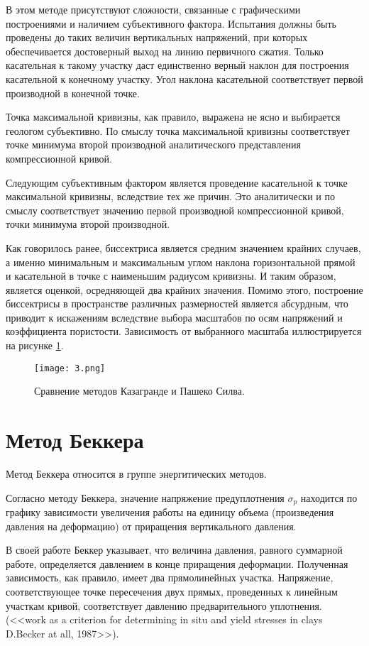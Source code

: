 В этом методе присутствуют сложности, связанные с графическими построениями и наличием субъективного фактора.
Испытания должны быть проведены до таких величин вертикальных напряжений, при которых обеспечивается достоверный выход на линию первичного сжатия. Только касательная к такому участку даст единственно верный наклон для построения касательной к конечному участку. Угол наклона касательной соответствует первой производной в конечной точке.

Точка максимальной кривизны, как правило, выражена не ясно и выбирается геологом субъективно. По смыслу точка максимальной кривизны соответствует точке минимума второй производной аналитического представления компрессионной кривой.

Следующим субъективным фактором является проведение касательной к точке максимальной кривизны, вследствие тех же причин. Это аналитически и по смыслу соответствует значению первой производной компрессионной кривой, точки минимума второй производной.

Как говорилось ранее, биссектриса является средним значением крайних случаев, а именно минимальным и максимальным углом наклона горизонтальной прямой и касательной в точке с наименьшим радиусом кривизны. 
И таким образом, является оценкой,  осредняющей два крайних значения. 
Помимо этого, построение биссектрисы в пространстве различных размерностей является абсурдным, что приводит к искажениям вследствие выбора масштабов по осям напряжений и коэффициента пористости. \cite{boone_critical_2010}
Зависимость от выбранного масштаба  иллюстрируется на рисунке \ref{fig:ellipse}.

 \begin{figure}
    \label{fig:ellipse}
    \center
    \texttt{[image: 3.png]}
    \caption{Сравнение методов Казагранде и Пашеко Силва.}
\end{figure}
    
\section{Метод Беккера}

Метод Беккера относится в группе энергитических методов.

Согласно методу Беккера, значение напряжение предуплотнения $\sigma_p$ находится по графику зависимости увеличения работы на единицу объема (произведения давления на деформацию) от приращения вертикального давления.

В своей работе Беккер указывает, что величина давления, равного суммарной работе, определяется давлением в конце приращения деформации. 
Полученная зависимость, как правило, имеет два прямолинейных участка. 
Напряжение, соответствующее точке пересечения двух прямых, проведенных к линейным участкам кривой, соответствует давлению предварительного уплотнения. (<<work as a criterion for determining in situ and yield stresses in clays D.Becker at all, 1987>>).


